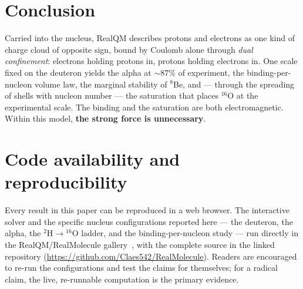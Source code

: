 \documentclass[11pt]{article}
\begin{document}
\section{Conclusion}

Carried into the nucleus, RealQM describes protons and electrons as one kind of charge cloud of
opposite sign, bound by Coulomb alone through \emph{dual confinement}: electrons holding protons
in, protons holding electrons in. One scale fixed on the deuteron yields the alpha at ${\sim}87\%$ of
experiment, the binding-per-nucleon volume law, the marginal stability of $^8$Be, and ---
through the spreading of shells with nucleon number --- the saturation that places $^{16}$O at
the experimental scale.
The binding and the saturation are both electromagnetic. Within this model, \textbf{the strong
force is unnecessary}.

\section*{Code availability and reproducibility}

Every result in this paper can be reproduced in a web browser. The interactive solver and the
specific nucleus configurations reported here --- the deuteron, the alpha, the
$^2\mathrm{H}\!\to\!{}^{16}\mathrm{O}$ ladder, and the binding-per-nucleon study --- run directly
in the RealQM/RealMolecule gallery~\cite{Gallery}, with the complete source in the linked
repository (\url{https://github.com/Claes542/RealMolecule}). Readers are encouraged to re-run the
configurations and test the claims for themselves; for a radical claim, the live, re-runnable
computation is the primary evidence.
\end{document}
